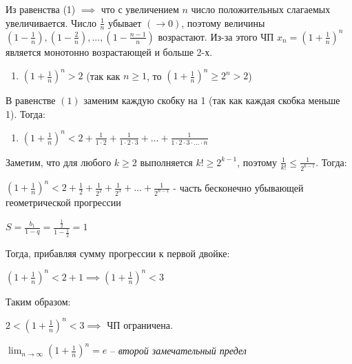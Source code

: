 \documentclass[12pt, a4paper]{article}
\theoremstyle{remark}
\begin{document}
	Из равенства (1) \(\implies\) что с увеличением \(n\) число положительных слагаемых увеличивается. Число \(\frac{1}{n}\) убывает \((\to 0)\), поэтому величины \(\left(1 - \frac{1}{n}\right), \left(1 - \frac{2}{n}\right), ... , \left(1 - \frac{n - 1}{n}\right)\) возрастают. Из-за этого ЧП \(x_n = \left(1 + \frac{1}{n}\right)^{n}\) является монотонно возрастающей и больше 2-х.  

	\begin{enumerate}[label=(\arabic*), start = 2]
		\item $\left(1 + \frac{1}{n}\right)^n > 2$ \quad (так как \(n \ge 1\), то \(\left(1 + \frac{1}{n}\right)^n \ge 2^n > 2\))
	\end{enumerate}

	В равенстве $(1)$ заменим каждую скобку на 1 (так как каждая скобка меньше 1). Тогда:

	\begin{enumerate}[label=(\arabic*), start = 3]
		\item $\left(1 + \frac{1}{n}\right)^n < 2 + \frac{1}{1 \cdot 2} + \frac{1}{1 \cdot 2 \cdot 3} + ... + \frac{1}{1 \cdot 2 \cdot 3 \cdot ... \cdot n}$
	\end{enumerate}

	Заметим, что для любого \(k \ge 2\) выполняется \(k! \ge 2^{k-1}\), поэтому \(\frac{1}{k!} \le \frac{1}{2^{k-1}}\). Тогда:
	\vspace{0.4cm}

	$\left(1+ \frac{1}{n}\right)^n < 2 + \frac{1}{2} + \frac{1}{2^2} + \frac{1}{2^3} + ... + \frac{1}{2^{n-1}}$ - часть бесконечно убывающей геометрической прогрессии 
	\vspace{0.4cm}

	$S = \frac{b_1}{1 - q} = \frac{\frac{1}{2}}{1 - \frac{1}{2}} = 1$
	\vspace{0.4cm}

	Тогда, прибавляя сумму прогрессии к первой двойке:
	\vspace{0.4cm}

	$\left(1 + \frac{1}{n}\right) ^ n < 2 + 1 \implies \left(1 + \frac{1}{n}\right)^n < 3$
	\vspace{0.4cm}

	Таким образом:
	\vspace{0.4cm}

	$2 < \left(1 + \frac{1}{n}\right)^n < 3 \implies$ ЧП ограничена.

	\begin{tcolorbox}[colframe=red!70!black, colback=white, boxrule=1pt, arc=3pt, width=\textwidth]
		\centering
		\large
		\(\displaystyle \lim_{n \to \infty} \left(1 + \frac{1}{n}\right)^n = e\) 
		\hspace{1cm} 
		\normalsize -- \textit{второй замечательный предел}
	\end{tcolorbox}
\end{document}
